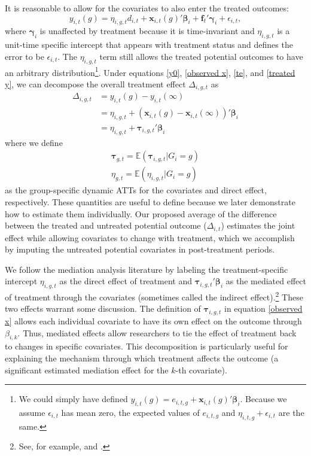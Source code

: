 \documentclass[12pt,fleqn]{article}
\def\*#1{\mathbf{#1}}
\def\+#1{\boldsymbol{#1}}
\begin{document}
It is reasonable to allow for the covariates to also enter the treated outcomes:
\begin{equation}
    y_{i,t}(g) = \eta_{i,g,t}d_{i,t} + \*x_{i,t}(g)' \+\beta_i + \*f_t' \+\gamma_i + \epsilon_{i,t},\label{treated y}
\end{equation}
where $\+\gamma_i$ is unaffected by treatment because it is time-invariant and $\eta_{i,g,t}$ is a unit-time specific intercept that appears with treatment status and defines the error to be $\epsilon_{i,t}$. The $\eta_{i,g,t}$ term still allows the treated potential outcomes to have an arbitrary distribution\footnote{We could simply have defined $y_{i,t}(g) = e_{i,t,g} + \*x_{i,t}(g)' \+\beta_i$. Because we assume $\epsilon_{i,t}$ has mean zero, the expected values of $e_{i,t,g}$ and $\eta_{i,t,g} + \epsilon_{i,t}$ are the same.}. Under equations \eqref{y0}, \eqref{observed x}, \eqref{te}, and \eqref{treated y}, we can decompose the overall treatment effect $\Delta_{i,g,t}$ as
\begin{align*}
    \Delta_{i,g,t} 
    &= y_{i,t}(g) - y_{i,t}(\infty)\\
    &= \eta_{i,g,t} + (\*x_{i,t}(g) - \*x_{i,t}(\infty))' \+\beta_i \\
    &= \eta_{i,g,t} + \+\tau_{i,g,t}' \+\beta_i
\end{align*}
where we define
\begin{align}
    \+\tau_{g,t} = \mathbb{E}(\+\tau_{i,g,t} | G_i = g)\label{covariate ATT}\\
    \eta_{g,t} = \mathbb{E}(\eta_{i,g,t} | G_i = g)\label{direct ATT}
\end{align}
as the group-specific dynamic ATTs for the covariates and direct effect, respectively. These quantities are useful to define because we later demonstrate how to estimate them individually. Our proposed average of the difference between the treated and untreated potential outcome ($\Delta_{i,t}$) estimates the joint effect while allowing covariates to change with treatment, which we accomplish by imputing the untreated potential covariates in post-treatment periods.

We follow the mediation analysis literature by labeling the treatment-specific intercept $\eta_{i,g,t}$ as the direct effect of treatment and $\+\tau_{i,g,t}'\+\beta_i$ as the mediated effect of treatment through the covariates (sometimes called the indirect effect).\footnote{See, for example, \citet{mackinnon2007mediation} and \citet{huber2014identifying}.} These two effects warrant some discussion. The definition of $\+\tau_{i,g,t}$ in equation \eqref{observed x} allows each individual covariate to have its own effect on the outcome through $\beta_{i,k}$. Thus, mediated effects allow researchers to tie the effect of treatment back to changes in specific covariates. This decomposition is particularly useful for explaining the mechanism through which treatment affects the outcome (a significant estimated mediation effect for the $k$-th covariate). 
\end{document}
